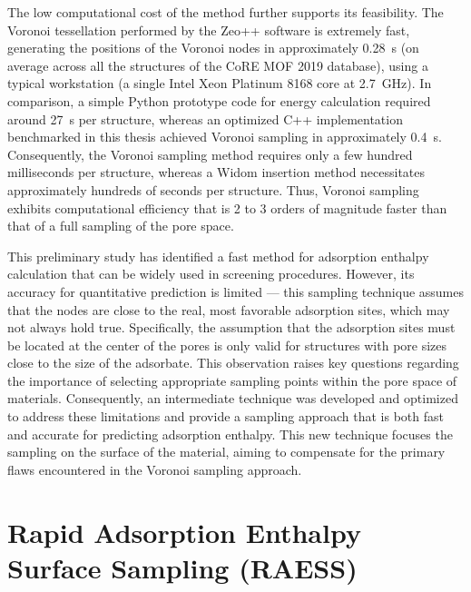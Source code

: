 \documentclass[main]{subfiles}
\begin{document}
The low computational cost of the method further supports its feasibility. The Voronoi tessellation performed by the Zeo++ software is extremely fast, generating the positions of the Voronoi nodes in approximately \SI{0.28}{\second} (on average across all the structures of the CoRE MOF 2019 database), using a typical workstation (a single Intel Xeon Platinum 8168 core at 2.7~\si{\giga\hertz}). In comparison, a simple Python prototype code for energy calculation required around \SI{27}{\second} per structure, whereas an optimized C++ implementation benchmarked in this thesis achieved Voronoi sampling in approximately \SI{0.4}{\second}. Consequently, the Voronoi sampling method requires only a few hundred milliseconds per structure, whereas a Widom insertion method necessitates approximately hundreds of seconds per structure. Thus, Voronoi sampling exhibits computational efficiency that is 2 to 3 orders of magnitude faster than that of a full sampling of the pore space.

This preliminary study has identified a fast method for adsorption enthalpy calculation that can be widely used in screening procedures. However, its accuracy for quantitative prediction is limited --- this sampling technique assumes that the nodes are close to the real, most favorable adsorption sites, which may not always hold true. Specifically, the assumption that the adsorption sites must be located at the center of the pores is only valid for structures with pore sizes close to the size of the adsorbate. This observation raises key questions regarding the importance of selecting appropriate sampling points within the pore space of materials. Consequently, an intermediate technique was developed and optimized to address these limitations and provide a sampling approach that is both fast and accurate for predicting adsorption enthalpy. This new technique focuses the sampling on the surface of the material, aiming to compensate for the primary flaws encountered in the Voronoi sampling approach.

\section{Rapid Adsorption Enthalpy Surface Sampling (RAESS)}\label{sct:RAESS}
\end{document}
